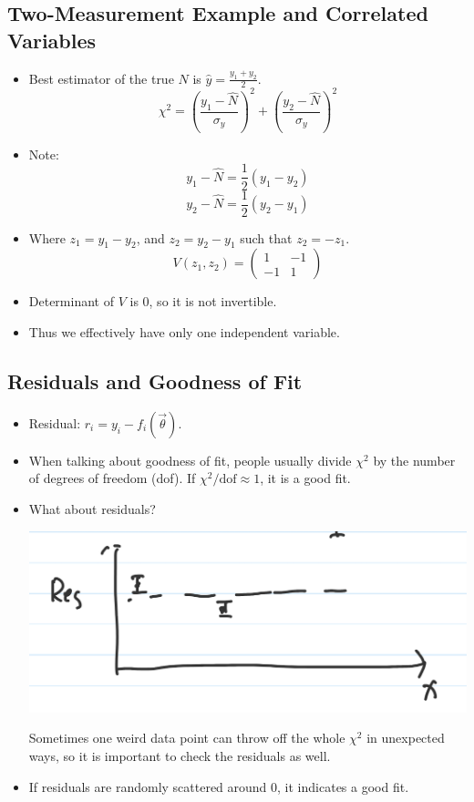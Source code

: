 \subsection{Two-Measurement Example and Correlated Variables}

\begin{itemize}
      \item Best estimator of the true $N$ is $\hat{y} = \frac{y_1 + y_2}{2}$.
            \[
                  \chi^2 = \left( \frac{y_1 - \hat{N}}{\sigma_y} \right)^2 +
                  \left( \frac{y_2 - \hat{N}}{\sigma_y} \right)^2
            \]
      \item Note:
            \[
                  y_1 - \hat{N} = \frac{1}{2} (y_1 - y_2)
            \]
            \[
                  y_2 - \hat{N} = \frac{1}{2} (y_2 - y_1)
            \]
      \item Where $z_1 = y_1 - y_2$, and $z_2 = y_2 - y_1$ such that $z_2 = -z_1$.
            \[
                  V(z_1, z_2) =
                  \begin{pmatrix}
                        1  & -1 \\
                        -1 & 1
                  \end{pmatrix}
            \]
      \item Determinant of $V$ is 0, so it is not invertible.
      \item Thus we effectively have only one independent variable.
\end{itemize}

\subsection{Residuals and Goodness of Fit}

\begin{itemize}
      \item Residual: $r_i = y_i - f_i(\vec{\theta})$.
      \item When talking about goodness of fit, people usually divide $\chi^2$ by the number of degrees of freedom (dof). If $\chi^2/\text{dof} \approx 1$, it is a good fit.
      \item What about residuals?

            \includegraphics[width=0.5\linewidth]{Images/lec11-residual.png}

            Sometimes one weird data point can throw off the whole $\chi^2$ in unexpected ways, so it is important to check the residuals as well.
      \item If residuals are randomly scattered around 0, it indicates a good fit.
\end{itemize}

